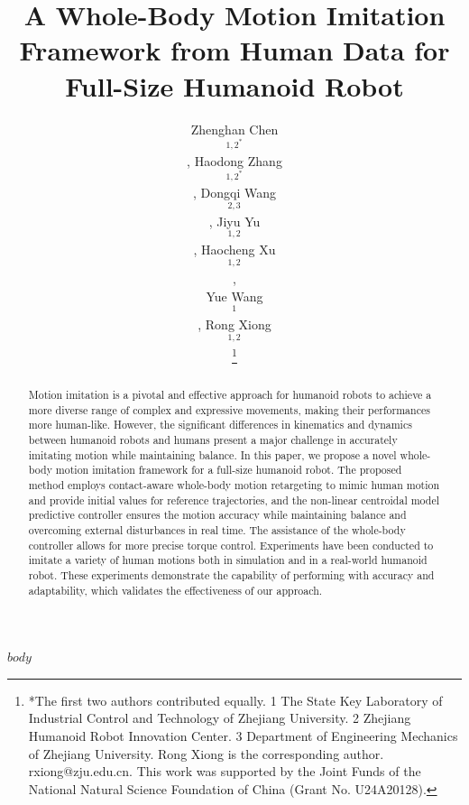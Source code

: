\documentclass[a4paper, 10pt, conference]{../styles/ieeeconf/ieeeconf}
\title{\LARGE \bf
A Whole-Body Motion Imitation Framework from Human Data for Full-Size Humanoid Robot
}
\author{Zhenghan Chen$$^{1,2^*} $$, Haodong Zhang$$^{1,2^*}$$, Dongqi Wang$$^{2,3}$$, Jiyu Yu$$^{1,2}$$, Haocheng Xu$$^{1,2}$$, \\ Yue Wang$$^{1}$$, Rong Xiong$$^{1,2}$$ 
\thanks{*The first two authors contributed equally. 1 The State Key Laboratory of Industrial Control and Technology of Zhejiang University. 2 Zhejiang Humanoid Robot Innovation Center. 3 Department of Engineering Mechanics of Zhejiang University. Rong Xiong is the corresponding author. rxiong@zju.edu.cn. This work was supported by the Joint Funds of the National Natural Science Foundation of China (Grant No. U24A20128).}
}
\begin{document}
\maketitle
\thispagestyle{empty}
\pagestyle{empty}


\begin{abstract}

Motion imitation is a pivotal and effective approach for humanoid robots to achieve a more diverse range of complex and expressive movements, making their performances more human-like. However, the significant differences in kinematics and dynamics between humanoid robots and humans present a major challenge in accurately imitating motion while maintaining balance. In this paper, we propose a novel whole-body motion imitation framework for a full-size humanoid robot. The proposed method employs contact-aware whole-body motion retargeting to mimic human motion and provide initial values for reference trajectories, and the non-linear centroidal model predictive controller ensures the motion accuracy while maintaining balance and overcoming external disturbances in real time. The assistance of the whole-body controller allows for more precise torque control. Experiments have been conducted to imitate a variety of human motions both in simulation and in a real-world humanoid robot. These experiments demonstrate the capability of performing with accuracy and adaptability, which validates the effectiveness of our approach.


\end{abstract}
$body$

\end{document}
